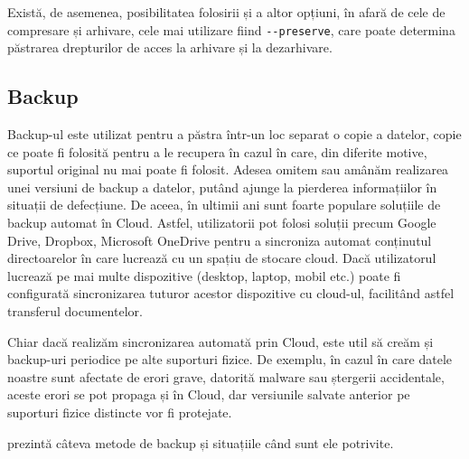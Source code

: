 Există, de asemenea, posibilitatea folosirii și a altor opțiuni, în afară de
cele de compresare și arhivare, cele mai utilizare fiind \texttt{-{}-preserve},
care poate determina păstrarea drepturilor de acces la arhivare și la
dezarhivare.

\subsection{Backup}
\label{sec:file-system-backup}

Backup-ul este utilizat pentru a păstra într-un loc separat o copie a datelor, copie ce
poate fi folosită pentru a le recupera în cazul în care, din diferite motive,
suportul original nu mai poate fi folosit. Adesea omitem sau amânăm realizarea
unei versiuni de backup a datelor, putând ajunge la pierderea informațiilor în
situații de defecțiune. De aceea, în ultimii ani sunt foarte populare soluțiile
de backup automat în Cloud. Astfel, utilizatorii pot folosi soluții precum
Google Drive, Dropbox, Microsoft OneDrive pentru a sincroniza automat conținutul
directoarelor în care lucrează cu un spațiu de stocare cloud. Dacă utilizatorul
lucrează pe mai multe dispozitive (desktop, laptop, mobil etc.) poate fi
configurată sincronizarea tuturor acestor dispozitive cu cloud-ul, facilitând
astfel transferul documentelor.

Chiar dacă realizăm sincronizarea automată prin Cloud, este util să creăm și
backup-uri periodice pe alte suporturi fizice. De exemplu, în cazul în care
datele noastre sunt afectate de erori grave, datorită malware sau ștergerii
accidentale, aceste erori se pot propaga și în Cloud, dar versiunile salvate
anterior pe suporturi fizice distincte vor fi protejate.

 prezintă câteva metode de backup și situațiile când sunt ele
potrivite.

